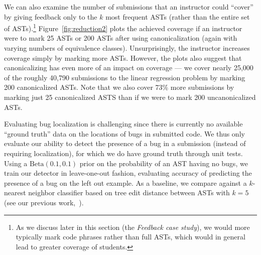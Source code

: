We can also examine the number of submissions that an instructor could ``cover'' by giving feedback only to
the $k$ most frequent ASTs (rather than the entire set of ASTs).\footnote{
As we discuss later in this section (the \emph{Feedback case study}), we would more typically  mark code phrases rather than full ASTs,
which would in general lead to greater coverage of students.}
Figure~\ref{fig:reduction2} plots the achieved coverage if an instructor were to mark 25 ASTs or 200 ASTs
after using canonicalization (again with varying numbers of equivalence classes).
Unsurprisingly, the instructor increases coverage simply by marking more ASTs.  However,
the plots also suggest that canonicalizing has even more of an impact on coverage --- we cover nearly 25,000
of the roughly 40,790 submissions to the linear regression problem by marking 200 canonicalized ASTs.
Note that we also cover 73\% more submissions by marking just 25 canonicalized ASTS than 
if we were to mark 200 uncanonicalized ASTs.

Evaluating bug localization is challenging since there is currently no available ``ground truth'' data
on the locations of bugs in submitted code.  We thus only evaluate our ability to detect
the presence of a bug in a submission (instead of requiring localization), for which we do have ground truth through unit tests.
Using a $\mbox{Beta}(0.1, 0.1)$ prior on the probability of an AST having no bugs, 
we train our detector in leave-one-out fashion, evaluating accuracy of predicting the presence of a bug 
on the left out example.  
As a baseline, we compare against a $k$-nearest neighbor classifier based on tree edit distance between
ASTs with $k=5$ (see our previous work,~\cite{huang13}).  



